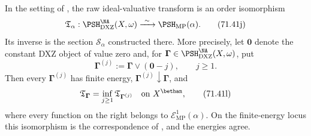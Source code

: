 \begin{theorem}
\label{thm:p143-full-kahler-comparison}
In the setting of , the raw
ideal-valuative transform is an order isomorphism
\[
 \mathfrak T_\alpha:
 \PSH^{\NA}_{\mathrm{DXZ}}(X,\omega)
 \xrightarrow{\ \sim\ }
 \PSH_{\mathrm{MP}}(\alpha).
\tag{71.41j}\label{eq:p143-full-kahler-comparison}
\]
Its inverse is the section \(\mathcal S_\alpha\) constructed there.
More precisely, let \(\mathbf 0\) denote the constant DXZ object of value
zero and, for \(\boldsymbol\Gamma\in
\PSH^{\NA}_{\mathrm{DXZ}}(X,\omega)\), put
\[
 \boldsymbol\Gamma^{(j)}
 :=\boldsymbol\Gamma\vee(\mathbf 0-j),
 \qquad j\geq1.
\tag{71.41k}\label{eq:p143-dxz-truncation}
\]
Then every \(\boldsymbol\Gamma^{(j)}\) has finite energy,
\(\boldsymbol\Gamma^{(j)}\downarrow\boldsymbol\Gamma\), and
\[
 \mathfrak T_{\boldsymbol\Gamma}
 =\inf_{j\geq1}\mathfrak T_{\boldsymbol\Gamma^{(j)}}
 \quad\text{on }X^{\bethan},
\tag{71.41l}\label{eq:p143-raw-truncation-limit}
\]
where every function on the right belongs to
\(\mathcal E^1_{\mathrm{MP}}(\alpha)\).  On the finite-energy locus this
isomorphism is the correspondence of
, and the energies agree.
\end{theorem}

